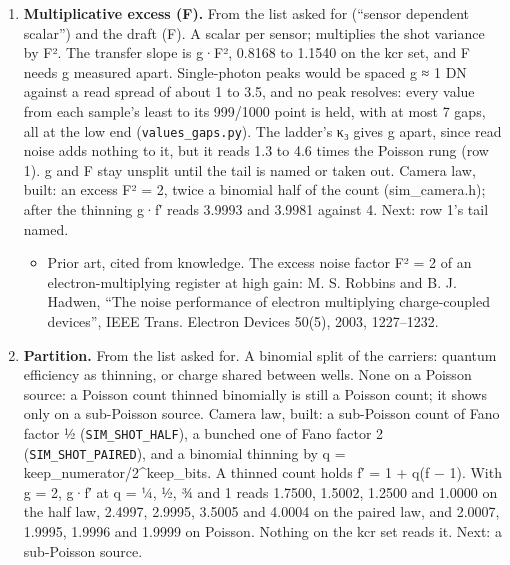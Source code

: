 \begin{enumerate}
\item \textbf{Multiplicative excess (F).} From the list asked for (“sensor dependent scalar”) and the draft (F). A scalar per sensor; multiplies the shot variance by F². The transfer slope is g·F², 0.8168 to 1.1540 on the kcr set, and F needs g measured apart. Single-photon peaks would be spaced g ≈ 1 DN against a read spread of about 1 to 3.5, and no peak resolves: every value from each sample's least to its 999/1000 point is held, with at most 7 gaps, all at the low end (\texttt{values\_\allowbreak{}gaps.\allowbreak{}py}). The ladder's κ₃ gives g apart, since read noise adds nothing to it, but it reads 1.3 to 4.6 times the Poisson rung (row 1). g and F stay unsplit until the tail is named or taken out. Camera law, built: an excess F² = 2, twice a binomial half of the count (sim\_\allowbreak{}camera.h); after the thinning g·f′ reads 3.9993 and 3.9981 against 4. Next: row 1's tail named.

\begin{itemize}
\item Prior art, cited from knowledge. The excess noise factor F² = 2 of an electron-multiplying register at high gain: M. S. Robbins and B. J. Hadwen, “The noise performance of electron multiplying charge-coupled devices”, IEEE Trans. Electron Devices 50(5), 2003, 1227–1232.
\end{itemize}
\item \textbf{Partition.} From the list asked for. A binomial split of the carriers: quantum efficiency as thinning, or charge shared between wells. None on a Poisson source: a Poisson count thinned binomially is still a Poisson count; it shows only on a sub-Poisson source. Camera law, built: a sub-Poisson count of Fano factor ½ (\texttt{SIM\_\allowbreak{}SHOT\_\allowbreak{}HALF}), a bunched one of Fano factor 2 (\texttt{SIM\_\allowbreak{}SHOT\_\allowbreak{}PAIRED}), and a binomial thinning by q = keep\_\allowbreak{}numerator/2\textasciicircum{}keep\_\allowbreak{}bits. A thinned count holds f′ = 1 + q(f − 1). With g = 2, g·f′ at q = ¼, ½, ¾ and 1 reads 1.7500, 1.5002, 1.2500 and 1.0000 on the half law, 2.4997, 2.9995, 3.5005 and 4.0004 on the paired law, and 2.0007, 1.9995, 1.9996 and 1.9999 on Poisson. Nothing on the kcr set reads it. Next: a sub-Poisson source.


\end{enumerate}
